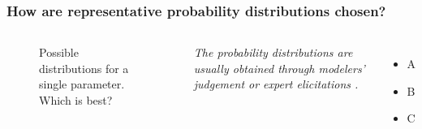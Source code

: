 \begin{frame}
    \frametitle{How are representative probability distributions chosen?}

    \begin{columns}
        \column[t]{5cm}
        \begin{figure}
            \centering
            \resizebox{\columnwidth}{!}{
                
            }
            \caption{Possible distributions for a single parameter. Which is best?}
            \label{fig:many-distributions}
        \end{figure}
        \column[t]{5cm}
            \textit{The probability distributions are usually obtained through modelers'
            judgement or expert elicitations \cite{yue_review_2018}.}

            \begin{itemize}
                \item A \pause
                \item B \pause
                \item C
            \end{itemize}
    \end{columns}

\end{frame}

